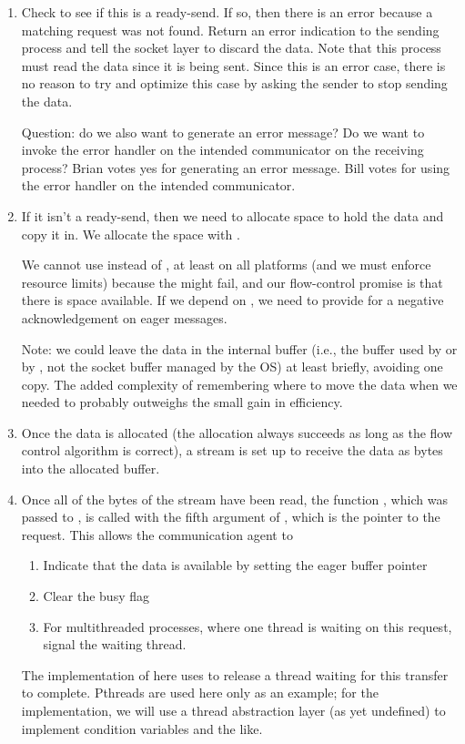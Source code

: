 \begin{enumerate}
\item Check to see if this is a ready-send.  If so, then there is an error
  because a matching request was not found.  Return an error indication to the
  sending process and tell the socket layer to discard the data.
  Note that this process must read the data since it is being sent.  Since
  this is an error case, there is no reason to try and optimize this case by
  asking the sender to stop sending the data.

  Question: do we also want to generate an error message?  Do we want to
  invoke the error handler on the intended communicator on the receiving
  process?  Brian votes yes for generating an error message.  Bill votes for
  using the error handler on the intended communicator.  

\item If it isn't a ready-send, then we need to allocate space to hold the
  data and copy it in.  We allocate the space with
  . 

  We cannot
  use  instead of , at least on all
  platforms (and we must enforce 
  resource limits) because the  might fail, and our flow-control
  promise is that there is space available.  If we depend on , we
  need to provide for a negative acknowledgement on eager messages.

  Note: we could leave the data in the internal buffer (i.e., the buffer used
  by  or by , not the socket buffer
  managed by the OS) at least briefly,
  avoiding one copy.  The added complexity of remembering where to move the
  data when we needed to probably outweighs the small gain in efficiency.

\item Once the data is allocated (the allocation always succeeds as long as
  the flow control algorithm is correct), a stream is set up to receive the
  data as bytes into the allocated buffer.  

\item Once all of the bytes of the stream have been read, the function
  , which was passed to
  , is called with the fifth argument of
  , which is the pointer to the request.  This
  allows the communication agent to 
  \begin{enumerate}
  \item Indicate that the data is available by setting the eager buffer
    pointer
  \item Clear the busy flag
  \item For multithreaded processes, where one thread is waiting on this
    request, signal the waiting thread.
  \end{enumerate}
  The implementation of  here uses
   to release a thread waiting for this transfer to
  complete.  Pthreads are used here only as an example; for the
  implementation, we will use a thread abstraction layer (as yet undefined) to
  implement condition variables and the like.


\end{enumerate}
